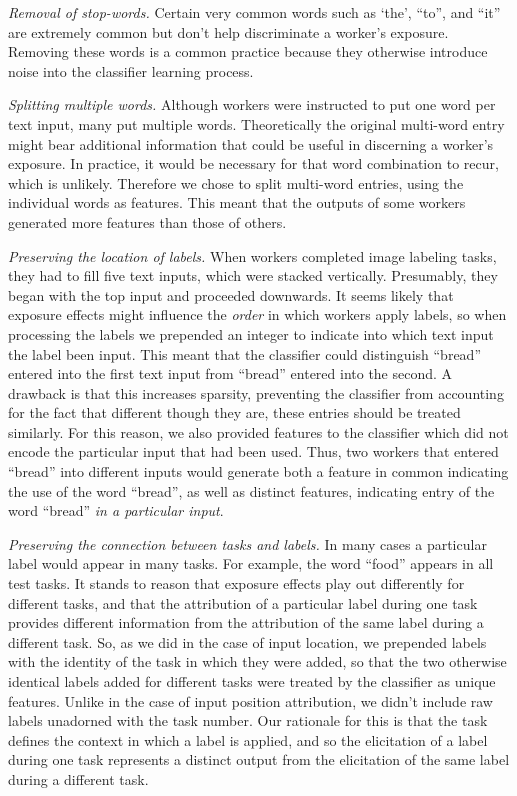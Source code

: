 \documentclass[12pt]{article}
\begin{document}
	\textit{Removal of stop-words.}  Certain very common words such as `the',
	``to'', and ``it'' are extremely common but don't help discriminate a 
	worker's exposure.  Removing these words is a common practice because
	they otherwise introduce noise into the classifier learning process.

	\textit{Splitting multiple words.}  Although workers were 
	instructed to put one word per text input, many put multiple words.
	Theoretically the original multi-word entry might bear additional 
	information that could be useful in discerning a worker's exposure. 
	In practice, it would be necessary for that word combination to recur,
	which is unlikely.  Therefore we chose to split multi-word entries,
	using the individual words as features.  This meant that the outputs of
	some workers generated more features than those of others.

	\textit{Preserving the location of labels.}  When workers completed image
	labeling tasks, they had to fill five text inputs, which were stacked
	vertically.  Presumably, they began with the top input and proceeded 
	downwards.  It seems likely that exposure effects might influence the
	\textit{order} in which workers apply labels, so when processing the 
	labels we prepended an integer to indicate into which text input the 
	label been input.  This meant that the classifier could distinguish
	``bread'' entered into the first text input from ``bread'' entered into
	the second.  A drawback is that this increases sparsity, preventing the
	classifier from accounting for the fact that different though they are,
	these entries should be treated similarly.  For this reason, we also
	provided features to the classifier which did not encode the particular
	input that had been used.  Thus, two workers that entered ``bread''
	into different inputs would generate both a feature in common indicating
	the use of the word ``bread'', as well as distinct features, indicating
	entry of the word ``bread'' \textit{in a particular input}.

	\textit{Preserving the connection between tasks and labels.}  In many
	cases a particular label would appear in many tasks.  For example, the
	word ``food'' appears in all test tasks.  It stands to reason that
	exposure effects play out differently for different tasks, and that
	the attribution of a particular label during one task provides different
	information from the attribution of the same label during a different 
	task.  So, as we did in the case of input location, we prepended labels
	with the identity of the task in which they were added, so that the 
	two otherwise identical labels added for different tasks were treated
	by the classifier as unique features.  Unlike in the case of input 
	position attribution, we didn't include raw labels unadorned with 
	the task number.  Our rationale for this is that the task defines the 
	context in which a label is applied, and so the elicitation of a label 
	during one task represents a distinct output from the elicitation of the 
	same label during a different task.  
\end{document}
